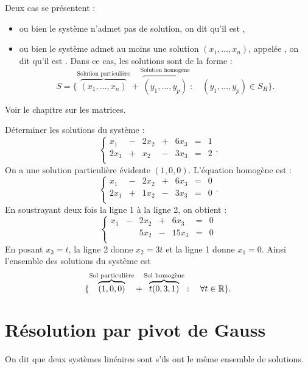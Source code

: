 \documentclass[a4paper]{book}
\begin{document}
\begin{Theoreme}
Deux cas se présentent :
\begin{itemize}
\item ou bien le système n'admet pas de solution, on dit qu'il est , 
\item ou bien le système admet au moins une solution $(x_1,\dots,x_n)$, appelée , on dit qu'il est . Dans ce cas, les solutions sont de la forme :
$$ S=\{\overbrace{(x_1,\dots ,x_n)}^{\text{Solution particulière}}+ \overbrace{(y_1,\dots,y_p)}^{\text{Solution homogène}}:\quad (y_1,\dots,y_p) \in S_H\}.$$
\end{itemize}
\end{Theoreme}
\begin{Demonstration}
Voir le chapitre sur les matrices.
\end{Demonstration}
\begin{Exemple}
Déterminer les solutions du système : 
$$\left\{{\begin{matrix}
x_{1}&-&2x_{2}&+&6x_{3}&=&1\\
2x_{1}&+&x_{2}&-&3x_{3}&=&2\\
\end{matrix}}\right. .$$
On a une solution particulière évidente $(1,0,0)$. L'équation homogène est :
$$\left\{{\begin{matrix}
x_{1}&-&2x_{2}&+&6x_{3}&=&0\\
2x_{1}&+&1x_{2}&-&3x_{3}&=&0\\
\end{matrix}}\right. .$$
En soustrayant deux fois la ligne 1 à la ligne 2, on obtient :
$$\left\{{\begin{matrix}
x_{1}&-&2x_{2}&+&6x_{3}&=&0\\
     &&5x_{2}&-&15x_{3}&=&0\\
\end{matrix}}\right. $$
En posant $x_3=t$, la ligne 2 donne $x_2=3t$ et la ligne 1 donne $x_1=0$. Ainsi l'ensemble des solutions du système est 
$$\{  \overbrace{(1,0,0)}^{\text{Sol particulière}} +\overbrace{t(0,3,1)}^{\text{Sol homogène}}:\quad\forall t \in \mathbb{R} \}.$$
\end{Exemple}
\section{Résolution par pivot de Gauss}
\begin{Definition}
On dit que deux systèmes linéaires sont  s'ils ont le même ensemble de solutions.
\end{Definition}
\end{document}
